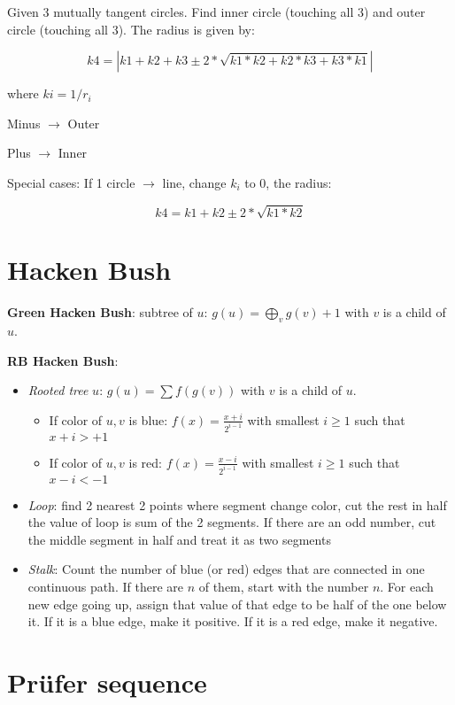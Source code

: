 \documentclass[a4paper]{article}
\begin{document}
\begin{landscape}
\begin{multicols}{2}
Given 3 mutually tangent circles. Find inner circle (touching all 3) and outer circle (touching all 3).
The radius is given by:

$$k4 = |k1 + k2 + k3 \pm 2*\sqrt{k1*k2 + k2*k3 + k3*k1}|$$

where $ki = 1/r_i$

Minus $\rightarrow$ Outer

Plus $\rightarrow$ Inner

Special cases: If 1 circle $\rightarrow$ line, change $k_i$ to 0, the radius:

$$k4 = k1 + k2 \pm 2*\sqrt{k1*k2}$$

\section{Hacken Bush}

\textbf{Green Hacken Bush}: subtree of $u$: $g(u) = \bigoplus_v {g(v)} + 1$ with $v$ is a child of $u$.

\textbf{RB Hacken Bush}:
\begin{itemize}
    \item \textit{Rooted tree} $u$: $g(u) = \sum{f(g(v))}$ with $v$ is a child of $u$.
    \begin{itemize}
        \item If color of ${u, v}$ is blue: $f(x) =  \frac{x + i}{2^{i-1}}$ with smallest $i \geq 1$ such that $x + i > +1$
        \item If color of ${u, v}$ is red:  $f(x) =  \frac{x - i}{2^{i-1}}$ with smallest $i \geq 1$ such that $x - i < -1$
    \end{itemize}
    \item \textit{Loop}: find 2 nearest 2 points where segment change color, cut the rest in half
the value of loop is sum of the 2 segments. If there are an odd number, cut the middle segment
in half and treat it as two segments 
    \item \textit{Stalk}: Count the number of blue (or red) edges that are connected in one continuous path.
If there are $n$ of them, start with the number $n$. For each new edge going up, assign that value 
of that edge to be half of the one below it.  If it is a blue edge, make it positive.
If it is a red edge, make it negative.
\end{itemize}

\section{Prüfer sequence}


\end{multicols}
\end{landscape}
\end{document}
